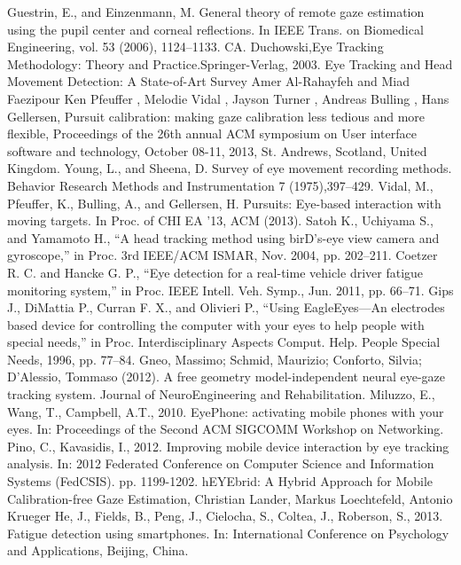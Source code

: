   \newpage

  \begin{thebibliography}{00}
    Guestrin, E., and Einzenmann, M. General theory of remote gaze estimation using the pupil center and corneal reflections. In IEEE Trans. on Biomedical Engineering, vol. 53 (2006), 1124–1133.
   CA. Duchowski,Eye Tracking Methodology: Theory and Practice.Springer-Verlag, 2003.
   Eye Tracking and Head Movement Detection: A State-of-Art Survey Amer Al-Rahayfeh and Miad Faezipour
   Ken Pfeuffer , Melodie Vidal , Jayson Turner , Andreas Bulling , Hans Gellersen, Pursuit calibration: making gaze calibration less tedious and more flexible, Proceedings of the 26th annual ACM symposium on User interface software and technology, October 08-11, 2013, St. Andrews, Scotland, United Kingdom.
   Young, L., and Sheena, D. Survey of eye movement recording methods. Behavior Research Methods and Instrumentation 7 (1975),397–429.
   Vidal, M., Pfeuffer, K., Bulling, A., and Gellersen, H. Pursuits: Eye-based interaction with moving targets. In Proc. of CHI EA ’13, ACM (2013).
   Satoh K., Uchiyama S., and Yamamoto H., “A head tracking method using birD's-eye view camera and gyroscope,” in Proc. 3rd IEEE/ACM ISMAR, Nov. 2004, pp. 202–211.
   Coetzer R. C. and Hancke G. P., “Eye detection for a real-time vehicle driver fatigue monitoring system,” in Proc. IEEE Intell. Veh. Symp., Jun. 2011, pp. 66–71.
   Gips J., DiMattia P., Curran F. X., and Olivieri P., “Using EagleEyes—An electrodes based device for controlling the computer with your eyes to help people with special needs,” in Proc. Interdisciplinary Aspects Comput. Help. People Special Needs, 1996, pp. 77–84.
   Gneo, Massimo; Schmid, Maurizio; Conforto, Silvia; D’Alessio, Tommaso (2012). A free geometry model-independent neural eye-gaze tracking system. Journal of NeuroEngineering and Rehabilitation. 
   Miluzzo, E., Wang, T., Campbell, A.T., 2010. EyePhone: activating mobile phones with your eyes. In: Proceedings of the Second ACM SIGCOMM Workshop on Networking.
   Pino, C., Kavasidis, I., 2012. Improving mobile device interaction by eye tracking analysis. In: 2012 Federated Conference on Computer Science and Information Systems (FedCSIS). pp. 1199-1202.
   hEYEbrid: A Hybrid Approach for Mobile Calibration-free Gaze Estimation, Christian Lander, Markus Loechtefeld, Antonio Krueger
   He, J., Fields, B., Peng, J., Cielocha, S., Coltea, J., Roberson, S., 2013. Fatigue detection using smartphones. In: International Conference on Psychology and Applications, Beijing, China.

\end{thebibliography}
